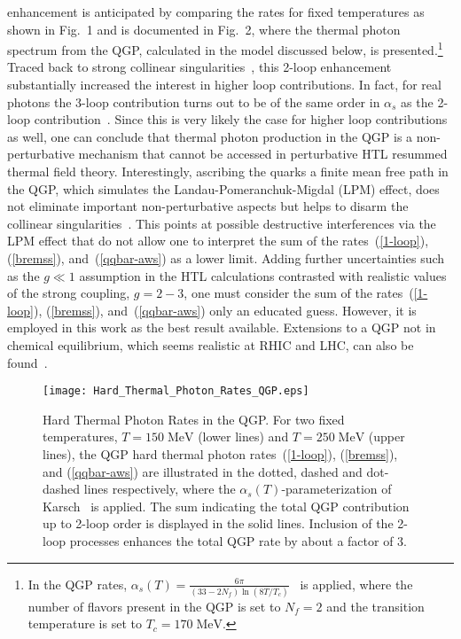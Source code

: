 \documentclass[12pt,twoside,fleqn]{article}
\newcommand{\figcaptionwidth}{15.cm}
\newcommand{\MeV}{\mbox{MeV}}
\begin{document}
enhancement is anticipated by comparing the rates for fixed temperatures as
shown in Fig.~1 and is documented in Fig.~2, where the thermal photon spectrum
from the QGP, calculated in the model discussed below, is presented.\footnote{In
  the QGP rates, $\alpha_s(T)=\frac{6\pi}{(33 - 2
    N_f)\ln(8T/T_c)}$~\cite{KARSCH_1988} is applied, where the number of flavors
  present in the QGP is set to $N_f=2$ and the transition temperature is set to
  $T_c=170\;\MeV$.} Traced back to strong collinear
singularities~\cite{AURENCHE_1998}, this 2-loop enhancement substantially
increased the interest in higher loop contributions. In fact, for real photons
the 3-loop contribution turns out to be of the same order in $\alpha_s$ as the
2-loop contribution~\cite{AURENCHE_2000}. Since this is very likely the case for
higher loop contributions as well, one can conclude that thermal photon
production in the QGP is a non-perturbative mechanism that cannot be accessed in
perturbative HTL resummed thermal field theory. Interestingly, ascribing the
quarks a finite mean free path in the QGP, which simulates the
Landau-Pomeranchuk-Migdal (LPM) effect, does not eliminate important
non-perturbative aspects but helps to disarm the collinear
singularities~\cite{AURENCHE_LPM_2000}. This points at possible destructive
interferences via the LPM effect that do not allow one to interpret the sum of
the rates~(\ref{1-loop}), (\ref{bremss}), and~(\ref{qqbar-aws}) as a lower
limit. Adding further uncertainties such as the $g \ll 1$ assumption in the HTL
calculations contrasted with realistic values of the strong coupling, $g = 2 -
3$, one must consider the sum of the rates~(\ref{1-loop}), (\ref{bremss}),
and~(\ref{qqbar-aws}) only an educated guess. However, it is employed in this
work as the best result available. Extensions to a QGP not in chemical
equilibrium, which seems realistic at RHIC and LHC, can also be
found~\cite{STRICKLAND_1994,TRAXLER_1996,SRIVASTAVA_1997,BAIER_1997,MUSTAFA_CNEQ_2000}.
\begin{figure}
  \texttt{[image: Hard\_Thermal\_Photon\_Rates\_QGP.eps]}
  \parbox{\figcaptionwidth}{\caption[Hard Thermal Photon Rates in the QGP] {Hard
      Thermal Photon Rates in the QGP. For two fixed temperatures, $T=150\;\MeV$
      (lower lines) and $T=250\;\MeV$ (upper lines), the QGP hard thermal photon
      rates~(\ref{1-loop}), (\ref{bremss}), and (\ref{qqbar-aws}) are
      illustrated in the dotted, dashed and dot-dashed lines respectively, where
      the $\alpha_s(T)$-parameterization of Karsch~\cite{KARSCH_1988} is
      applied. The sum indicating the total QGP contribution up to 2-loop order
      is displayed in the solid lines. Inclusion of the 2-loop processes
      enhances the total QGP rate by about a factor of 3.}}
\label{Fig_hard_thermal_photon_rates_QGP}
\end{figure} 
\end{document}
